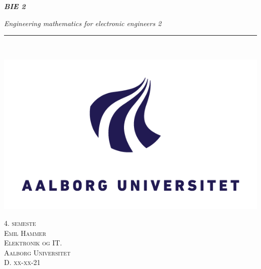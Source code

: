 \thispagestyle{empty}


\begin{center}
\vspace{0.3cm}
\textsl{\Huge \textbf{BIE 2}}
\end{center}

\begin{flushright}
\textsl{\huge Engineering mathematics for electronic engineers 2}\\ 


\rule{14.8cm}{0.3mm} \\ 
\vspace{1cm}
\vspace{1cm}

\vspace{2.5cm}

\includegraphics[width=1\textwidth]{billeder/forside.png}

\vspace{2cm} 
\textsc{\Large 4. semeste \\
Emil Hammer\\
Elektronik og IT.\\
Aalborg Universitet\\
D. xx-xx-21\\}
\end{flushright}
\clearpage